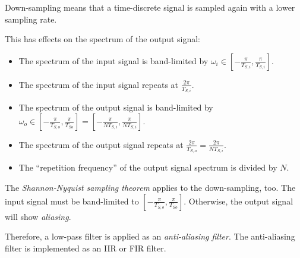 \begin{refsection}
Down-sampling means that a time-discrete signal is sampled again with a lower sampling rate.

This has effects on the spectrum of the output signal:
\begin{itemize}
	\item The spectrum of the input signal is band-limited by $\omega_i \in [-\frac{\pi}{T_{S,i}}, \frac{\pi}{T_{S,i}}]$.
	\item The spectrum of the input signal repeats at $\frac{2\pi}{T_{S,i}}$.
	\item The spectrum of the output signal is band-limited by $\omega_o \in [-\frac{\pi}{T_{S,o}}, \frac{\pi}{T_{So}}] = [-\frac{\pi}{N T_{S,i}}, \frac{\pi}{N T_{S,i}}]$.
	\item The spectrum of the output signal repeats at $\frac{2\pi}{T_{S,o}} = \frac{2\pi}{N T_{S,i}}$.
	\item The ``repetition frequency'' of the output signal spectrum is divided by $N$.
\end{itemize}

\begin{fact}
	The  \emph{Shannon-Nyquist sampling theorem} applies to the down-sampling, too. The input signal must be band-limited to $[-\frac{\pi}{T_{S,o}}, \frac{\pi}{T_{So}}]$. Otherwise, the output signal will show  \emph{aliasing}.
\end{fact}

Therefore, a low-pass filter is applied as an \emph{anti-aliasing filter}. The anti-aliasing filter is implemented as an \ac{IIR} or \ac{FIR} filter.

\begin{figure}[H]
	\centering
	
\end{figure}
\end{refsection}
